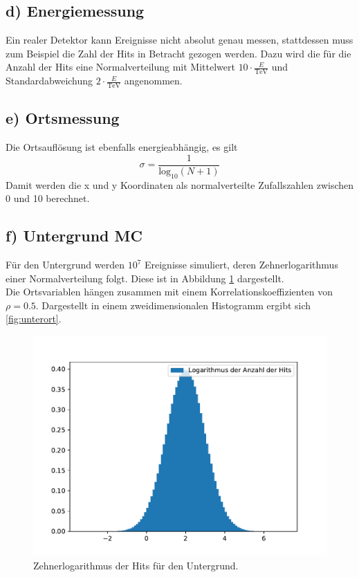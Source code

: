 \subsection{d) Energiemessung}
    Ein realer Detektor kann Ereignisse nicht absolut genau messen, stattdessen muss zum Beispiel die Zahl der Hits in Betracht gezogen werden.
    Dazu wird die für die Anzahl der Hits eine Normalverteilung mit Mittelwert $10 \cdot \frac{E}{\text{TeV}}$ und Standardabweichung $2 \cdot \frac{E}{\text{TeV}}$
    angenommen.\\

\subsection{e) Ortsmessung}
    Die Ortsauflösung ist ebenfalls energieabhängig, es gilt
    \begin{equation*}
        \sigma = \frac{1}{\text{log}_{10}(N + 1)}
    \end{equation*}
    Damit werden die x und y Koordinaten als normalverteilte Zufallszahlen zwischen 0 und 10 berechnet.

\subsection{f) Untergrund MC}
    Für den Untergrund werden $10^7$ Ereignisse simuliert, deren Zehnerlogarithmus einer Normalverteilung folgt. Diese ist in Abbildung \ref{fig:unter} dargestellt.\\
    Die Ortsvariablen hängen zusammen mit einem Korrelationskoeffizienten von $\rho = 0.5$. Dargestellt in einem zweidimensionalen Histogramm ergibt sich \ref{fig:unterort}.

    \begin{figure}
        \centering
        \includegraphics[width=\textwidth]{unter.pdf}
        \caption{Zehnerlogarithmus der Hits für den Untergrund.}
        \label{fig:unter}
    \end{figure}
    
